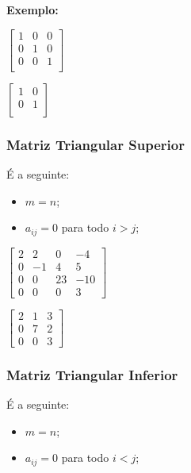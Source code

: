 \documentclass[oneside,a4paper,12pt]{article}
\begin{document}
\textbf{Exemplo: }

\begin{multicols}{2}
	$
	\left[
	\begin{array}{ccc}
	1	&	0	&	0	\\
	0	&	1	&	0	\\
	0	&	0	&	1	\\
	\end{array}
	\right]
	$
	
	$
	\left[
	\begin{array}{cc}
	1	&	0	\\
	0	&	1	\\
	\end{array}
	\right]
	$
	
\end{multicols}

\subsubsection{Matriz Triangular Superior}

É a seguinte:
\begin{itemize}
	\item $m=n$;
	\item $a_{ij}=0$ para todo $i > j$;
\end{itemize}

\begin{multicols}{2}
	$
	\left[
	\begin{array}{cccc}
	2	&	2	&	0	&	-4	\\
	0	&	-1	&	4	&	5	\\
	0	&	0	&	23	&	-10	\\
	0	&	0	&	0	&	3
	\end{array}
	\right]
	$
	
	$
	\left[
	\begin{array}{ccc}
	2	&	1	&	3	\\
	0	&	7	&	2	\\
	0	&	0	&	3
	\end{array}
	\right]
	$
	
\end{multicols}


\subsubsection{Matriz Triangular Inferior}

É a seguinte:
\begin{itemize}
	\item $m=n$;
	\item $a_{ij}=0$ para todo $i < j$;
\end{itemize}
\end{document}
